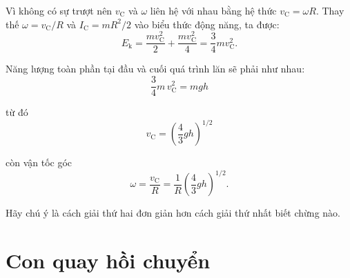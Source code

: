 Vì không có sự trượt nên $v_{\text{C}}$ và $\omega$ liên hệ với nhau bằng hệ thức $v_{\text{C}}=\omega R$. Thay thế $\omega=v_{\text{C}}/R$ và $I_{\text{C}}=mR^2/2$ vào biểu thức động năng, ta được:
\begin{equation*}
	E_{\text{k}} = \frac{mv_{\text{C}}^2}{2} + \frac{mv_{\text{C}}^2}{4} = \frac{3}{4}mv_{\text{C}}^2.
\end{equation*}

Năng lượng toàn phần tại đầu và cuối quá trình lăn sẽ phải như nhau:
\begin{equation*}
	\frac{3}{4}m\,v_{\text{C}}^2 = mgh
\end{equation*}

\noindent
từ đó
\begin{equation*}
	v_{\text{C}} = \left(\frac{4}{3}gh\right)^{1/2}
\end{equation*}

\noindent
còn vận tốc góc
\begin{equation*}
	\omega = \frac{v_{\text{C}}}{R} = \frac{1}{R} \left(\frac{4}{3}gh\right)^{1/2}.
\end{equation*}

Hãy chú ý là cách giải thứ hai đơn giản hơn cách giải thứ nhất biết chừng nào.

\section{Con quay hồi chuyển}\label{sec:5_9}

